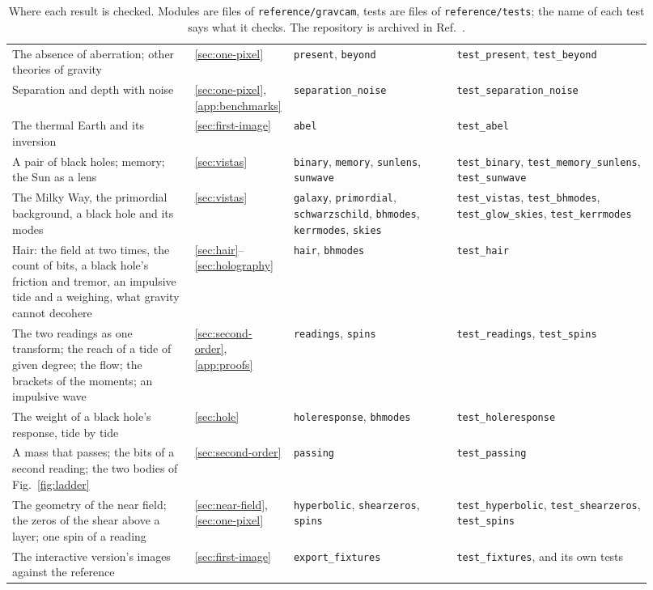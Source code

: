 \begin{table}
\begin{tabular}{p{0.29\linewidth}p{0.08\linewidth}p{0.25\linewidth}p{0.30\linewidth}}
The absence of aberration; other theories of gravity & \ref{sec:one-pixel} & \texttt{present}, \texttt{beyond} & \texttt{test\_present}, \texttt{test\_beyond} \\
Separation and depth with noise & \ref{sec:one-pixel}, \ref{app:benchmarks} & \texttt{separation\_noise} & \texttt{test\_separation\_noise} \\
The thermal Earth and its inversion & \ref{sec:first-image} & \texttt{abel} & \texttt{test\_abel} \\
A pair of black holes; memory; the Sun as a lens & \ref{sec:vistas} & \texttt{binary}, \texttt{memory}, \texttt{sunlens}, \texttt{sunwave} & \texttt{test\_binary}, \texttt{test\_memory\_sunlens}, \texttt{test\_sunwave} \\
The Milky Way, the primordial background, a black hole and its modes & \ref{sec:vistas} & \texttt{galaxy}, \texttt{primordial}, \texttt{schwarzschild}, \texttt{bhmodes}, \texttt{kerrmodes}, \texttt{skies} & \texttt{test\_vistas}, \texttt{test\_bhmodes}, \texttt{test\_glow\_skies}, \texttt{test\_kerrmodes} \\
Hair: the field at two times, the count of bits, a black hole's friction and tremor, an impulsive tide and a weighing, what gravity cannot decohere & \ref{sec:hair}--\ref{sec:holography} & \texttt{hair}, \texttt{bhmodes} & \texttt{test\_hair} \\
The two readings as one transform; the reach of a tide of given degree; the flow; the brackets of the moments; an impulsive wave & \ref{sec:second-order}, \ref{app:proofs} & \texttt{readings}, \texttt{spins} & \texttt{test\_readings}, \texttt{test\_spins} \\
The weight of a black hole's response, tide by tide & \ref{sec:hole} & \texttt{holeresponse}, \texttt{bhmodes} & \texttt{test\_holeresponse} \\
A mass that passes; the bits of a second reading; the two bodies of Fig.~\ref{fig:ladder} & \ref{sec:second-order} & \texttt{passing} & \texttt{test\_passing} \\
The geometry of the near field; the zeros of the shear above a layer; one spin of a reading & \ref{sec:near-field}, \ref{sec:one-pixel} & \texttt{hyperbolic}, \texttt{shearzeros}, \texttt{spins} & \texttt{test\_hyperbolic}, \texttt{test\_shearzeros}, \texttt{test\_spins} \\
The interactive version's images against the reference & \ref{sec:first-image} & \texttt{export\_fixtures} & \texttt{test\_fixtures}, and its own tests \\
\end{tabular}
\caption{Where each result is checked. Modules are files of
\texttt{reference/gravcam}, tests are files of \texttt{reference/tests}; the
name of each test says what it checks. The repository is archived in
Ref.~\cite{Mohsenvand2026Archive}.}\label{tab:checks}
\end{table}

